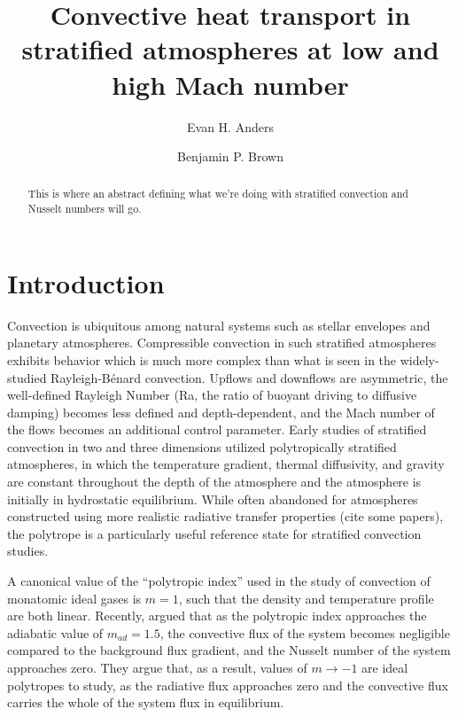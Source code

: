 \documentclass[aps, prl, twocolumn, groupedaddress]{revtex4-1}
\newcommand{\RB}{Rayleigh-B\'{e}nard }
\begin{document}
\author{Evan H. Anders}
\author{Benjamin P. Brown}
\title{Convective heat transport in stratified atmospheres at low and high Mach number}

\begin{abstract}
This is where an abstract defining what we're doing with stratified convection and Nusselt numbers will go.
\end{abstract}
\maketitle


\section{Introduction \label{section:intro}}
Convection is ubiquitous among natural systems such as stellar envelopes and planetary atmospheres.
Compressible convection in such stratified atmospheres exhibits behavior which is much more complex than 
what is seen in the widely-studied \RB convection.  Upflows and downflows are asymmetric, the well-defined
Rayleigh Number (Ra, the ratio of buoyant driving to diffusive damping) becomes less defined and depth-dependent,
and the Mach number of the flows becomes an additional control parameter.
Early studies of stratified
convection in two \cite{graham1975, chan&all1982, hurlburt&all1984, cattaneo&all1990} and three 
\cite{malagoli&all1990, cattaneo&all1991, brummell&all1996} dimensions
utilized polytropically stratified atmospheres, in which the temperature gradient, thermal diffusivity, and
gravity are constant throughout the depth of the atmosphere and the atmosphere is initially in hydrostatic equilibrium.
While often abandoned for atmospheres constructed using more realistic
radiative transfer properties (cite some papers), the polytrope is a particularly useful reference state for
stratified convection studies.

A canonical value of the ``polytropic index'' used in the study of convection of monatomic ideal gases is
$m = 1$, such that the density and temperature profile are both linear.  Recently, \cite{brandenburg&all2005}
argued that as the polytropic index approaches the adiabatic value of $m_{ad} = 1.5$, the convective flux of
the system becomes negligible compared to the background flux gradient, and the Nusselt number of the
system approaches zero.  They argue that, as a result, values of $m \rightarrow -1$ are ideal polytropes
to study, as the radiative flux approaches zero and the convective flux carries the whole of the system
flux in equilibrium. 
\end{document}
